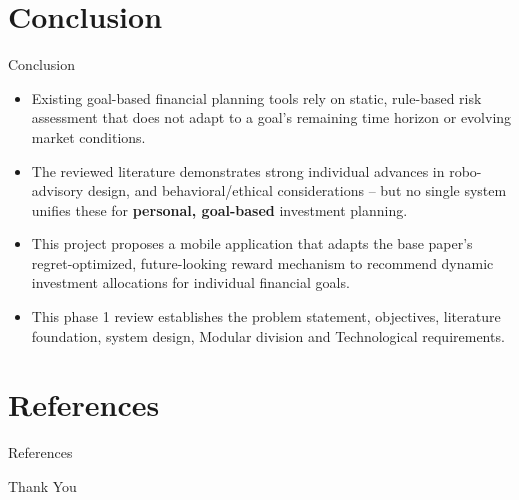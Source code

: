 \documentclass{beamer}
\begin{document}
\section{Conclusion}



\begin{frame}{Conclusion}
\small
\begin{itemize}
    \item Existing goal-based financial planning tools rely on static, rule-based risk assessment that does not adapt to a goal's remaining time horizon or evolving market conditions.
    \item The reviewed literature demonstrates strong individual advances in robo-advisory design, and behavioral/ethical considerations -- but no single system unifies these for \textbf{personal, goal-based} investment planning.
    \item This project proposes a mobile application that adapts the base paper's regret-optimized, future-looking reward mechanism to recommend dynamic investment allocations for individual financial goals.
    \item This phase 1 review establishes the problem statement, objectives, literature foundation, system design, Modular division and Technological requirements.
\end{itemize}
\end{frame}

\section{References}

\begin{frame}[allowframebreaks]{References}
    \nocite{*}
    
    
\end{frame}

\begin{frame}
\centering
\Huge Thank You
\end{frame}
\end{document}
